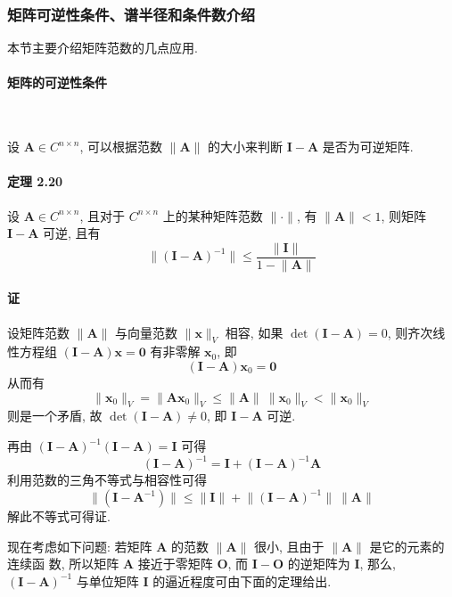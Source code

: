 \subsubsection{矩阵可逆性条件、谱半径和条件数介绍}

本节主要介绍矩阵范数的几点应用.

\paragraph[]{矩阵的可逆性条件} \

\par 设 $\bm{A} \in C^{n\times n}$, 可以根据范数 $\lVert \bm{A} \rVert$ 的大小来判断 $\bm{I} - \bm{A}$ 是否为可逆矩阵.

\paragraph*{定理 2.20} 设 $\bm{A} \in C^{n\times n}$, 且对于 $C^{n\times n}$ 上的某种矩阵范数 $\lVert \bm{\cdot} \rVert$, 有 $\lVert \bm{A} \rVert < 1$, 则矩阵 $\bm{I} - \bm{A}$ 可逆, 且有
$$
    \lVert (\bm{I} - \bm{A})^{-1} \rVert \leqslant \dfrac{\lVert \bm{I} \rVert}{1 - \lVert \bm{A} \rVert}
$$

\paragraph*{证} 设矩阵范数 $\lVert \bm{A} \rVert$ 与向量范数 $\lVert \bm{x} \rVert _V$ 相容, 如果 $\det (\bm{I} - \bm{A}) = 0$, 则齐次线性方程组 $(\bm{I} - \bm{A})\bm{x} = \bm{0}$ 有非零解 $\bm{x}_0$, 即
$$
    (\bm{I} - \bm{A})\bm{x}_0 = \bm{0}
$$
从而有
$$
    \lVert \bm{x}_0 \rVert _V = \lVert \bm{Ax}_0 \rVert _V \leqslant \lVert \bm{A} \rVert \ \lVert \bm{x}_0 \rVert _V < \lVert \bm{x}_0 \rVert _V
$$
则是一个矛盾, 故 $\det (\bm{I} - \bm{A}) \neq 0$, 即 $\bm{I} - \bm{A}$ 可逆.
\par 再由 $(\bm{I} - \bm{A})^{-1}(\bm{I} - \bm{A}) = \bm{I}$ 可得
$$
    (\bm{I} - \bm{A})^{-1} = \bm{I} + (\bm{I} - \bm{A})^{-1}\bm{A}
$$
利用范数的三角不等式与相容性可得
$$
    \lVert (\bm{I} - \bm{A}^{-1}) \rVert \leqslant \lVert \bm{I} \rVert + \lVert (\bm{I} - \bm{A})^{-1} \rVert \ \lVert \bm{A} \rVert
$$
解此不等式可得证.

\par 现在考虑如下问题: 若矩阵 $\bm{A}$ 的范数 $\lVert \bm{A} \rVert$ 很小, 且由于 $\lVert \bm{A} \rVert$ 是它的元素的连续函
数, 所以矩阵 $\bm{A}$ 接近于零矩阵 $\bm{O}$, 而 $\bm{I} - \bm{O}$ 的逆矩阵为 $\bm{I}$, 那么, $(\bm{I} - \bm{A})^{-1}$ 与单位矩阵 $\bm{I}$
的逼近程度可由下面的定理给出.

